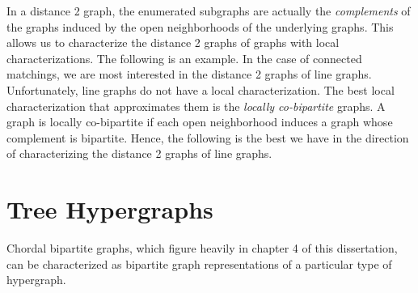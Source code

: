 In a distance 2 graph, the enumerated subgraphs are actually the {\it complements} of the graphs induced by the open neighborhoods of the underlying graphs.  This allows us to characterize the distance 2 graphs of graphs with local characterizations.  The following is an example.
In the case of connected matchings, we are most interested in the distance 2 graphs of line graphs.  Unfortunately, line graphs do not have a local characterization.  The best local characterization that approximates them is the {\it locally co-bipartite} graphs.  A graph is locally co-bipartite if each open neighborhood induces a graph whose complement is bipartite.  Hence, the following is the best we have in the direction of characterizing the distance 2 graphs of line graphs.

\section{Tree Hypergraphs}

Chordal bipartite graphs, which figure heavily in chapter 4 of this dissertation, can be characterized as bipartite graph representations of a particular type of hypergraph.  
